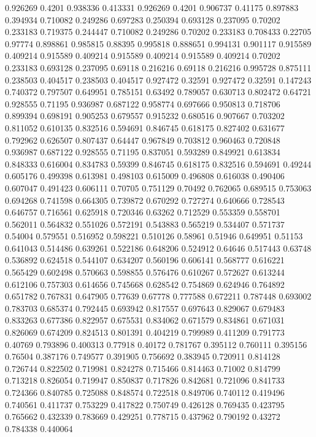 0.926269 0.4201
0.938336 0.413331
0.926269 0.4201
0.906737 0.41175
0.897883 0.394934
0.710082 0.249286
0.697283 0.250394
0.693128 0.237095
0.70202 0.233183
0.719375 0.244447
0.710082 0.249286
0.70202 0.233183
0.708433 0.22705
0.97774 0.898861
0.985815 0.88395
0.995818 0.888651
0.994131 0.901117
0.915589 0.409214
0.915589 0.409214
0.915589 0.409214
0.915589 0.409214
0.70202 0.233183
0.693128 0.237095
0.69118 0.216216
0.69118 0.216216
0.995728 0.875111
0.238503 0.404517
0.238503 0.404517
0.927472 0.32591
0.927472 0.32591
0.147243 0.740372
0.797507 0.649951
0.785151 0.63492
0.789057 0.630713
0.802472 0.64721
0.928555 0.71195
0.936987 0.687122
0.958774 0.697666
0.950813 0.718706
0.899394 0.698191
0.905253 0.679557
0.915232 0.680516
0.907667 0.703202
0.811052 0.610135
0.832516 0.594691
0.846745 0.618175
0.827402 0.631677
0.792962 0.626507
0.807437 0.64447
0.967849 0.703812
0.960463 0.720848
0.936987 0.687122
0.928555 0.71195
0.837051 0.593289
0.849921 0.613834
0.848333 0.616004
0.834783 0.59399
0.846745 0.618175
0.832516 0.594691
0.49244 0.605176
0.499398 0.613981
0.498103 0.615009
0.496808 0.616038
0.490406 0.607047
0.491423 0.606111
0.70705 0.751129
0.70492 0.762065
0.689515 0.753063
0.694268 0.741598
0.664305 0.739872
0.670292 0.727274
0.640666 0.728543
0.646757 0.716561
0.625918 0.720346
0.63262 0.712529
0.553359 0.558701
0.562011 0.564832
0.551026 0.572191
0.543883 0.565219
0.534407 0.571737
0.54004 0.579551
0.516952 0.598221
0.510126 0.58961
0.51946 0.649951
0.51153 0.641043
0.514486 0.639261
0.522186 0.648206
0.524912 0.64646
0.517443 0.63748
0.536892 0.624518
0.544107 0.634207
0.560196 0.606141
0.568777 0.616221
0.565429 0.602498
0.570663 0.598855
0.576476 0.610267
0.572627 0.613244
0.612106 0.757303
0.614656 0.745668
0.628542 0.754869
0.624946 0.764892
0.651782 0.767831
0.647905 0.77639
0.67778 0.777588
0.672211 0.787448
0.693002 0.783703
0.685374 0.792445
0.693942 0.817557
0.697643 0.829067
0.679483 0.833263
0.677386 0.822957
0.675531 0.834062
0.671579 0.834861
0.671031 0.826069
0.674209 0.824513
0.801391 0.404219
0.799989 0.411209
0.791773 0.40769
0.793896 0.400313
0.77918 0.40172
0.781767 0.395112
0.760111 0.395156
0.76504 0.387176
0.749577 0.391905
0.756692 0.383945
0.720911 0.814128
0.726744 0.822502
0.719981 0.824278
0.715466 0.814463
0.71002 0.814799
0.713218 0.826054
0.719947 0.850837
0.717826 0.842681
0.721096 0.841733
0.724366 0.840785
0.725088 0.848574
0.722518 0.849706
0.740112 0.419496
0.740561 0.411737
0.753229 0.417822
0.750749 0.426128
0.769435 0.423795
0.765662 0.432339
0.783669 0.429251
0.778715 0.437962
0.790192 0.43272
0.784338 0.440064
